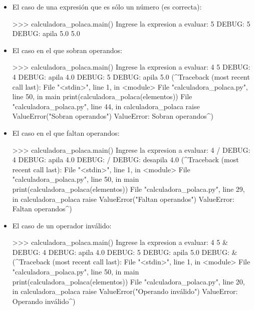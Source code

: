 \begin{itemize}
\item El caso de una expresión que es sólo un número (es correcta):

\begin{codigo-python-sn}
>>> calculadora_polaca.main()
Ingrese la expresion a evaluar: 5
DEBUG: 5
DEBUG: apila  5.0
5.0
\end{codigo-python-sn}

\item El caso en el que sobran operandos:

\begin{codigo-python-sn}
>>> calculadora_polaca.main()
Ingrese la expresion a evaluar: 4 5
DEBUG: 4
DEBUG: apila  4.0
DEBUG: 5
DEBUG: apila  5.0
(^Traceback (most recent call last):
  File "<stdin>", line 1, in <module>
  File "calculadora_polaca.py", line 50, in main
    print(calculadora_polaca(elementos))
  File "calculadora_polaca.py", line 44, in calculadora_polaca
    raise ValueError("Sobran operandos")
ValueError: Sobran operandos^)
\end{codigo-python-sn}

\item El caso en el que faltan operandos:

\begin{codigo-python-sn}
>>> calculadora_polaca.main()
Ingrese la expresion a evaluar: 4 /
DEBUG: 4
DEBUG: apila  4.0
DEBUG: /
DEBUG: desapila  4.0
(^Traceback (most recent call last):
  File "<stdin>", line 1, in <module>
  File "calculadora_polaca.py", line 50, in main
    print(calculadora_polaca(elementos))
  File "calculadora_polaca.py", line 29, in calculadora_polaca
    raise ValueError("Faltan operandos")
ValueError: Faltan operandos^)
\end{codigo-python-sn}

\item El caso de un operador inválido:

\begin{codigo-python-sn}
>>> calculadora_polaca.main()
Ingrese la expresion a evaluar: 4 5 &
DEBUG: 4
DEBUG: apila  4.0
DEBUG: 5
DEBUG: apila  5.0
DEBUG: &
(^Traceback (most recent call last):
  File "<stdin>", line 1, in <module>
  File "calculadora_polaca.py", line 50, in main
    print(calculadora_polaca(elementos))
  File "calculadora_polaca.py", line 20, in calculadora_polaca
    raise ValueError("Operando inválido")
ValueError: Operando inválido^)
\end{codigo-python-sn}


\end{itemize}
